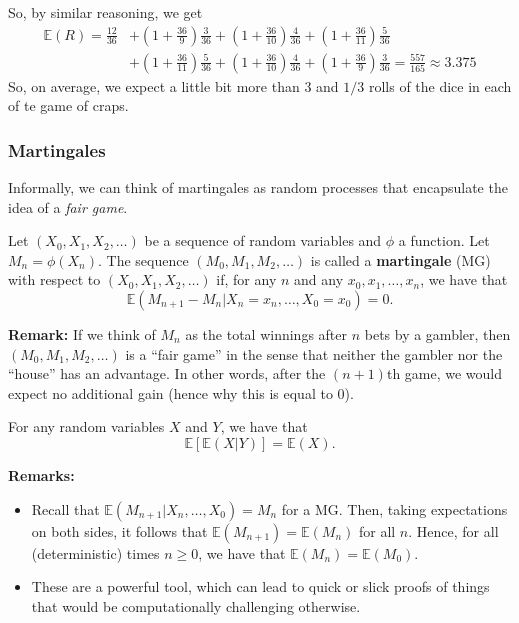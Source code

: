 \documentclass[letterpaper]{article}
\begin{document}
\begin{mdframed}[]
\begin{mdframed}[]
\begin{enumerate}
            \bigskip 

            So, by similar reasoning, we get 
            \begin{equation*}
                \begin{aligned}
                    \mathbb{E}(R) = \frac{12}{36} &+ \left(1 + \frac{36}{9}\right) \frac{3}{36} + \left(1 + \frac{36}{10}\right) \frac{4}{36} + \left(1 + \frac{36}{11}\right) \frac{5}{36} \\ 
                        &+ \left(1 + \frac{36}{11}\right) \frac{5}{36} + \left(1 + \frac{36}{10}\right) \frac{4}{36} + \left(1 + \frac{36}{9}\right)\frac{3}{36} = \frac{557}{165} \approx 3.375
                \end{aligned}
            \end{equation*}
            So, on average, we expect a little bit more than 3 and $1/3$ rolls of the dice in each of te game of craps. 
        \end{enumerate}
    \end{mdframed}
\end{mdframed}


\subsubsection{Martingales}
Informally, we can think of martingales as random processes that encapsulate the idea of a \emph{fair game}.
\begin{definition}{}{}
    Let $(X_0, X_1, X_2, \dots)$ be a sequence of random variables and $\phi$ a function. Let $M_n = \phi(X_n)$. The sequence $(M_0, M_1, M_2, \dots)$ is called a \textbf{martingale} (MG) with respect to $(X_0, X_1, X_2, \dots)$ if, for any $n$ and any $x_0, x_1, \dots, x_n$, we have that 
    \[\mathbb{E}(M_{n + 1} - M_{n} | X_{n} = x_n, \dots, X_0 = x_0) = 0.\]
\end{definition}
\textbf{Remark:} If we think of $M_n$ as the total winnings after $n$ bets by a gambler, then $(M_0, M_1, M_2, \dots)$ is a ``fair game'' in the sense that neither the gambler nor the ``house'' has an advantage. In other words, after the $(n + 1)$th game, we would expect no additional gain (hence why this is equal to 0).

\begin{theorem}{}{}
    For any random variables $X$ and $Y$, we have that 
    \[\mathbb{E}[\mathbb{E}(X | Y)] = \mathbb{E}(X).\]
\end{theorem}
\textbf{Remarks:} 
\begin{itemize}
    \item Recall that $\mathbb{E}(M_{n + 1} | X_n, \dots, X_0) = M_n$ for a MG. Then, taking expectations on both sides, it follows that $\mathbb{E}(M_{n + 1}) = \mathbb{E}(M_n)$ for all $n$. Hence, for all (deterministic) times $n \geq 0$, we have that $\mathbb{E}(M_n) = \mathbb{E}(M_0)$. 
    \item These are a powerful tool, which can lead to quick or slick proofs of things that would be computationally challenging otherwise. 
\end{itemize}
\end{document}
